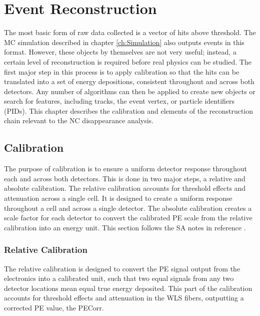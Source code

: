 \chapter{Event Reconstruction}
\label{ch:RecoCal}

The most basic form of raw data collected is a vector of hits above threshold. The MC simulation described in chapter \ref{ch:Simulation} also outputs events in this format. However, these objects by themselves are not very useful; instead, a certain level of reconstruction is required before real physics can be studied. The first major step in this process is to apply calibration so that the hits can be translated into a set of energy depositions, consistent throughout and across both detectors. Any number of algorithms can then be applied to create new objects or search for features, including tracks, the event vertex, or particle identifiers (PIDs). This chapter describes the calibration and elements of the reconstruction chain relevant to the NC disappearance analysis.

\section{Calibration}

The purpose of calibration is to ensure a uniform detector response throughout each and across both detectors. This is done in two major steps, a relative and absolute calibration. The relative calibration accounts for threshold effects and attenuation across a single cell. It is designed to create a uniform response throughout a cell and across a single detector. The absolute calibration creates a scale factor for each detector to convert the calibrated PE scale from the relative calibration into an energy unit. This section follows the SA notes in reference \cite{ref:TNCalib}.

\subsection{Relative Calibration}

The relative calibration is designed to convert the PE signal output from the electronics into a calibrated unit, such that two equal signals from any two detector locations mean equal true energy deposited. This part of the calibration accounts for threshold effects and attenuation in the WLS fibers, outputting a corrected PE value, the PECorr.

